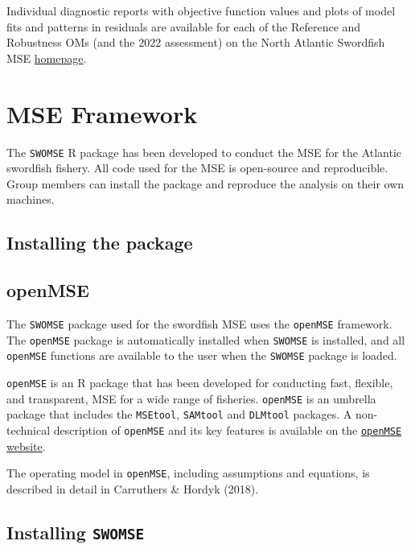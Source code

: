 \documentclass[
]{article}
\begin{document}
Individual diagnostic reports with objective function values and plots of model fits and patterns in residuals are available for each of the Reference and Robustness OMs (and the 2022 assessment) on the North Atlantic Swordfish MSE \href{https://iccat.github.io/nswo-mse/}{homepage}.

\hypertarget{mse-framework}{%
\section{MSE Framework}\label{mse-framework}}

The \texttt{SWOMSE} R package has been developed to conduct the MSE for the Atlantic swordfish fishery. All code used for the MSE is open-source and reproducible. Group members can install the package and reproduce the analysis on their own machines.

\hypertarget{installing-the-package}{%
\subsection{Installing the package}\label{installing-the-package}}

\hypertarget{openmse}{%
\subsection{openMSE}\label{openmse}}

The \texttt{SWOMSE} package used for the swordfish MSE uses the \texttt{openMSE} framework. The \texttt{openMSE} package is automatically installed when \texttt{SWOMSE} is installed, and all \texttt{openMSE} functions are available to the user when the \texttt{SWOMSE} package is loaded.

\texttt{openMSE} is an R package that has been developed for conducting fast, flexible, and transparent, MSE for a wide range of fisheries. \texttt{openMSE} is an umbrella package that includes the \texttt{MSEtool}, \texttt{SAMtool} and \texttt{DLMtool} packages. A non-technical description of \texttt{openMSE} and its key features is available on the \href{https://openmse.com/}{\texttt{openMSE} website}.

The operating model in \texttt{openMSE}, including assumptions and equations, is described in detail in Carruthers \& Hordyk (2018).

\hypertarget{installing-swomse}{%
\subsection{\texorpdfstring{Installing \texttt{SWOMSE}}{Installing SWOMSE}}\label{installing-swomse}}
\end{document}
